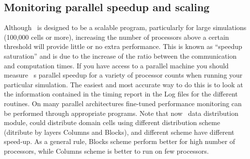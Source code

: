 \subsection{Monitoring parallel speedup and scaling}

Although \PDAC\ is designed to be a scalable program, particularly for
large simulations (100,000 cells or more), increasing the number of
processors above a certain threshold will provide little or no extra performance.
This is known as ``speedup saturation'' and is
due to the increase of the ratio between the communication and computation
times. If you have access to a parallel machine you should
measure \PDAC\ s parallel speedup for a variety of processor counts when
running your particular simulation. The easiest and most accurate way
to do this is to look at the information contained in the timing report
in the Log files for the different routines. On many parallel architectures
fine-tuned performance monitoring can be performed through appropriate programs.
Note that now \PDAC\ data distribution module, could distribute domain cells
using different distribution scheme (ditribute by layers Columns and Blocks),
and different scheme have different speed-up. As a general rule, Blocks
scheme perform better for high number of processors, while Columns scheme
is better to run on few processors.
